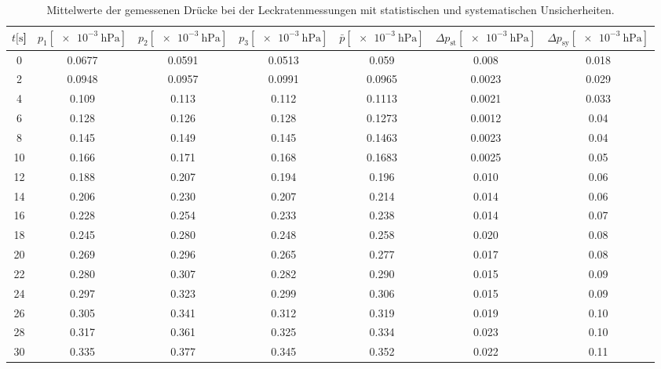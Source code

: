 \begin{table}[H]
    \centering
      \caption{Mittelwerte der gemessenen Drücke bei der Leckratenmessungen mit statistischen und systematischen Unsicherheiten.}
      \label{tab:Turbo_Leck1}
      \small{
      \begin{tabular}{
        S[table-format=3.0] 
        S[table-format=1.4] S[table-format=1.4] S[table-format=1.4]
        S[table-format=1.4] S[table-format=1.4] S[table-format=1.3]
        }
        \toprule
        {$t [\si{\second}$]} &
        {$p_1 [\SI{e-3}{\hecto\pascal}]$} & {$p_2 [\SI{e-3}{\hecto\pascal}]$} & {$p_3 [\SI{e-3}{\hecto\pascal}]$} &
        {$\bar{p} [\SI{e-3}{\hecto\pascal}]$} & {$\Delta p_\text{st} [\SI{e-3}{\hecto\pascal}]$} & {$\Delta p_\text{sy} [\SI{e-3}{\hecto\pascal}]$}\\
           &  0.0677 & 0.0591 &  0.0513 &0.059  & 0.008  & 0.018 \\
        2   &  0.0948 & 0.0957 &  0.0991 &0.0965 & 0.0023 & 0.029 \\
        4   &  0.109  & 0.113  &  0.112  &0.1113 & 0.0021 & 0.033 \\
        6   &  0.128  & 0.126  &  0.128  &0.1273 & 0.0012 & 0.04  \\
        8   &  0.145  & 0.149  &  0.145  &0.1463 & 0.0023 & 0.04  \\
        10  &  0.166  & 0.171  &  0.168  &0.1683 & 0.0025 & 0.05  \\
        12  &  0.188  & 0.207  &  0.194  &0.196  & 0.010  & 0.06  \\
        14  &  0.206  & 0.230  &  0.207  &0.214  & 0.014  & 0.06  \\
        16  &  0.228  & 0.254  &  0.233  &0.238  & 0.014  & 0.07  \\
        18  &  0.245  & 0.280  &  0.248  &0.258  & 0.020  & 0.08  \\
        20  &  0.269  & 0.296  &  0.265  &0.277  & 0.017  & 0.08  \\
        22  &  0.280  & 0.307  &  0.282  &0.290  & 0.015  & 0.09  \\
        24  &  0.297  & 0.323  &  0.299  &0.306  & 0.015  & 0.09  \\
        26  &  0.305  & 0.341  &  0.312  &0.319  & 0.019  & 0.10  \\
        28  &  0.317  & 0.361  &  0.325  &0.334  & 0.023  & 0.10  \\
        30  &  0.335  & 0.377  &  0.345  &0.352  & 0.022  & 0.11  \\

\end{tabular}}
\end{table}
